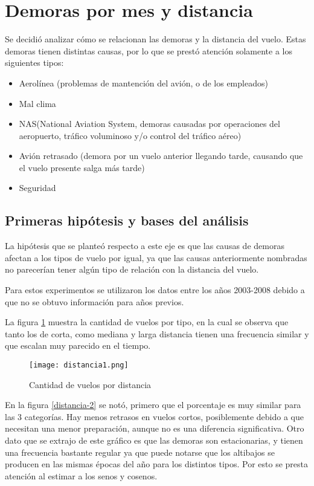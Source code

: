 \section{Demoras por mes y distancia}

Se decidió analizar cómo se relacionan las demoras y la distancia del vuelo. Estas demoras tienen distintas causas, por lo que se prestó atención solamente a los siguientes tipos:
\begin{itemize}
\item Aerolínea (problemas de mantención del avión, o de los empleados)
\item Mal clima
\item NAS(National Aviation System, demoras causadas por operaciones del aeropuerto, tráfico voluminoso y/o control del tráfico aéreo)
\item Avión retrasado (demora por un vuelo anterior llegando tarde, causando que el vuelo presente salga más tarde)
\item Seguridad
\end{itemize}

\subsection{Primeras hipótesis y bases del análisis}

La hipótesis que se planteó respecto a este eje es que las causas de demoras afectan a los tipos de vuelo por igual, ya que las causas anteriormente nombradas no parecerían tener algún tipo de relación con la distancia del vuelo.

Para estos experimentos se utilizaron los datos entre los años 2003-2008 debido a que no se obtuvo información para años previos.

La figura \ref{distancia-1} muestra la cantidad de vuelos por tipo, en la cual se observa que tanto los de corta, como mediana y larga distancia tienen una frecuencia similar y que escalan muy parecido en el tiempo.

\begin{figure}[!ht]
\centering
\texttt{[image: distancia1.png]}
\caption{Cantidad de vuelos por distancia}
\label{distancia-1}
\end{figure}

En la figura \ref{distancia-2} se notó, primero que el porcentaje es muy similar para las 3 categorías. Hay menos retrasos en vuelos cortos, posiblemente debido a que necesitan una menor preparación, aunque no es una diferencia significativa. Otro dato que se extrajo de este gráfico es que las demoras son estacionarias, y tienen una frecuencia bastante regular ya que puede notarse que los altibajos se producen en las mismas épocas del año para los distintos tipos. Por esto se presta atención al estimar a los senos y cosenos.

